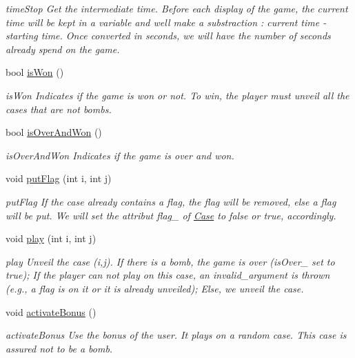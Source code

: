 \begin{DoxyCompactItemize}
\begin{DoxyCompactList}\small\item\em time\+Stop Get the intermediate time. Before each display of the game, the current time will be kept in a variable and we\textquotesingle{}ll make a substraction \+: current time -\/ starting time. Once converted in seconds, we will have the number of seconds already spend on the game. \end{DoxyCompactList}\item 
bool \hyperlink{class_game_a00c7a1babd45b85f4e828c2e11819110}{is\+Won} ()
\begin{DoxyCompactList}\small\item\em is\+Won Indicates if the game is won or not. To win, the player must unveil all the cases that are not bombs. \end{DoxyCompactList}\item 
bool \hyperlink{class_game_a9c1972964aca515fabb01f93841d018c}{is\+Over\+And\+Won} ()
\begin{DoxyCompactList}\small\item\em is\+Over\+And\+Won Indicates if the game is over and won. \end{DoxyCompactList}\item 
void \hyperlink{class_game_a1e50ebc43155a8ef4f01beb2ad769e0d}{put\+Flag} (int i, int j)
\begin{DoxyCompactList}\small\item\em put\+Flag If the case already contains a flag, the flag will be removed, else a flag will be put. We will set the attribut flag\+\_\+ of \hyperlink{class_case}{Case} to false or true, accordingly. \end{DoxyCompactList}\item 
void \hyperlink{class_game_ae2ad6aa30a56758bcd0842438a04b473}{play} (int i, int j)
\begin{DoxyCompactList}\small\item\em play Unveil the case (i,j). If there is a bomb, the game is over (is\+Over\+\_\+ set to true); If the player can not play on this case, an invalid\+\_\+argument is thrown (e.\+g., a flag is on it or it is already unveiled); Else, we unveil the case. \end{DoxyCompactList}\item 
\mbox{\label{class_game_ac8d0bdea6e61483d988106dc2dc69e7e}} 
void \hyperlink{class_game_ac8d0bdea6e61483d988106dc2dc69e7e}{activate\+Bonus} ()
\begin{DoxyCompactList}\small\item\em activate\+Bonus Use the bonus of the user. It plays on a random case. This case is assured not to be a bomb. \end{DoxyCompactList}\end{DoxyCompactItemize}


